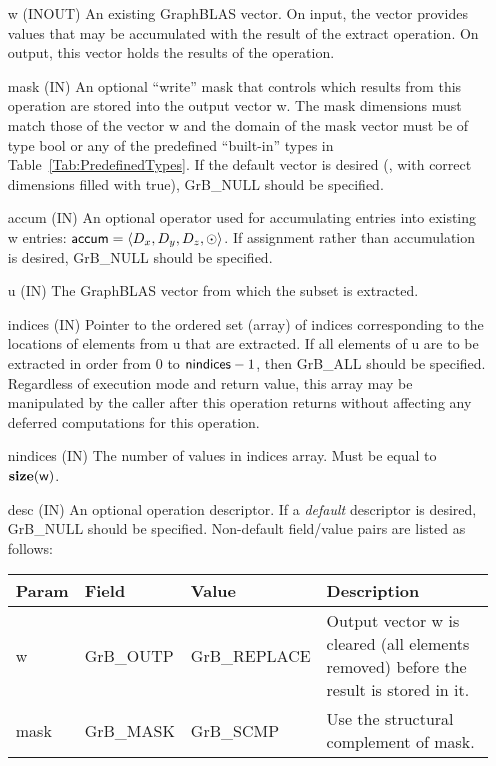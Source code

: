 \begin{itemize}[leftmargin=1in]
    \item[{\sf w}]    ({\sf INOUT}) An existing GraphBLAS vector.  On input,
    the vector provides values that may be accumulated with the result of the
    extract operation.  On output, this vector holds the results of the
    operation.

    \item[{\sf mask}] ({\sf IN}) An optional ``write'' mask that controls which
    results from this operation are stored into the output vector {\sf w}. The 
    mask dimensions must match those of the vector {\sf w} and the domain of the
    {\sf mask} vector must be of type {\sf bool} or any of the predefined 
    ``built-in'' types in Table~\ref{Tab:PredefinedTypes}.  If the default vector
    is desired (\ie, with correct dimensions filled with {\sf true}), 
    {\sf GrB\_NULL} should be specified.

    \item[{\sf accum}]    ({\sf IN}) An optional operator used for accumulating
    entries into existing {\sf w} entries: ${\sf accum} = \langle D_x,
    D_y, D_z,\odot \rangle$. If assignment rather than accumulation is
    desired, {\sf GrB\_NULL} should be specified.

    \item[{\sf u}]       ({\sf IN}) The GraphBLAS vector from which the subset
    is extracted.
    
    \item[{\sf indices}]  ({\sf IN}) Pointer to the ordered set (array) of 
    indices corresponding to the locations of elements from {\sf u} that are 
    extracted.  If all elements of {\sf u} are to be extracted in order from $0$ 
    to ${\sf nindices} - 1$, then {\sf GrB\_ALL} should be specified.  Regardless of 
    execution mode and return value, this array may be manipulated by the caller
    after this operation returns without affecting any deferred computations for 
    this operation.
    
    \item[{\sf nindices}] ({\sf IN}) The number of values in {\sf indices} array.
    Must be equal to $\bold{size}({\sf w})$.

    \item[{\sf desc}] ({\sf IN}) An optional operation descriptor. If
    a \emph{default} descriptor is desired, {\sf GrB\_NULL} should be
    specified. Non-default field/value pairs are listed as follows:  \\

    \begin{tabular}{lllp{2.5in}}
        Param & Field  & Value & Description \\
        \hline
        {\sf w}    & {\sf GrB\_OUTP} & {\sf GrB\_REPLACE} & Output vector {\sf w}
        is cleared (all elements removed) before the result is stored in it. \\
        
        {\sf mask} & {\sf GrB\_MASK} & {\sf GrB\_SCMP}   & Use the structural 
        complement of {\sf mask}. \\
    \end{tabular}
\end{itemize}

